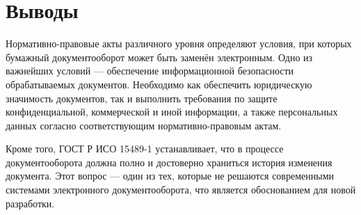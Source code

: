\section{Выводы} \label{rights_conclusion}

Нормативно-правовые акты различного уровня определяют условия, при которых бумажный документооборот может быть заменён электронным. Одно из важнейших условий --- обеспечение информационной безопасности обрабатываемых документов. Необходимо как обеспечить юридическую значимость документов, %
так и выполнить требования по защите конфиденциальной, коммерческой и иной информации, а также персональных данных согласно соответствующим нормативно-правовым актам.

Кроме того, ГОСТ Р ИСО 15489-1 устанавливает, что в процессе документооборота должна полно и достоверно храниться история изменения документа. Этот вопрос --- один из тех, которые не решаются современными системами электронного документооборота, что является обоснованием для новой разработки.

